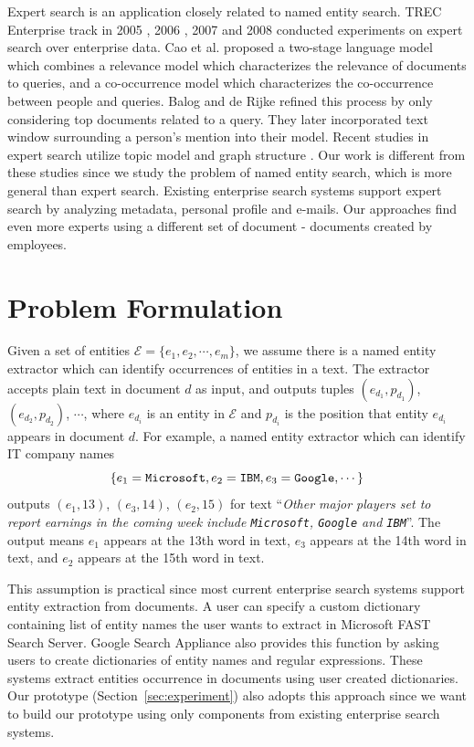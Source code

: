 \documentclass{sig-alternate}
\theoremstyle{definition}
\begin{document}
Expert search is an application closely related to named entity search. TREC Enterprise track in 2005 \cite{craswell2005overview}, 2006 \cite{soboroff2006overview}, 2007 \cite{bailey2007overview} and 2008 \cite{balog2008overview} conducted experiments on expert search over enterprise data. Cao et al. \cite{cao2005research} proposed a two-stage language model which combines a relevance model which characterizes the relevance of documents to queries, and a co-occurrence model which characterizes the co-occurrence between people and queries. Balog and de Rijke \cite{balog2006formal} refined this process by only considering top documents related to a query. They \cite{balog2008non} later incorporated text window surrounding a person's mention into their model. Recent studies in expert search utilize topic model \cite{tu2010citation} and graph structure \cite{karimzadehgan2009enhancing}. Our work is different from these studies since we study the problem of named entity search, which is more general than expert search. Existing enterprise search systems \cite{fast2010} \cite{ibmecm} \cite{gsa7} support expert search by analyzing metadata, personal profile and e-mails. Our approaches find even more experts using a different set of document - documents created by employees.

\section{Problem Formulation}\label{sec:problem}
Given a set of entities $\mathcal{E} = \{e_1, e_2, \cdots, e_m\}$, we assume there is a named entity extractor which can identify occurrences of entities in a text. The extractor accepts plain text in document $d$ as input, and outputs tuples $(e_{d_1}, p_{d_1})$, $(e_{d_2}, p_{d_2})$, $\cdots$, where $e_{d_i}$ is an entity in $\mathcal{E}$ and $p_{d_i}$ is the position that entity $e_{d_i}$ appears in document $d$. For example, a named entity extractor which can identify IT company names $$\{e_1 = \mbox{\tt Microsoft}, e_2 = \mbox{\tt IBM}, e_3 = \mbox{\tt Google}, \cdots\}$$ outputs $(e_1, 13)$, $(e_3, 14)$, $(e_2, 15)$ for text ``{\em Other major players set to report earnings in the coming week include {\tt Microsoft}, {\tt Google} and {\tt IBM}}''. The output means $e_1$ appears at the 13th word in text, $e_3$ appears at the 14th word in text, and $e_2$ appears at the 15th word in text.

This assumption is practical since most current enterprise search systems support entity extraction from documents. A user can specify a custom dictionary containing list of entity names the user wants to extract in Microsoft FAST Search Server. Google Search Appliance also provides this function by asking users to create dictionaries of entity names and regular expressions. These systems extract entities occurrence in documents using user created dictionaries. Our prototype (Section~\ref{sec:experiment}) also adopts this approach since we want to build our prototype using only components from existing enterprise search systems.
\end{document}
